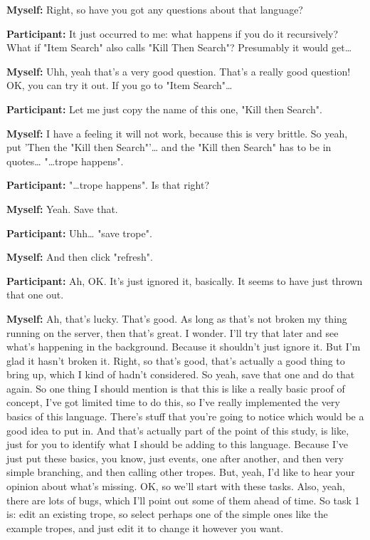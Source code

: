 \documentclass[11pt]{report}
\begin{document}
\begin{linenumbers}
\textbf{Myself:} Right, so have you got any questions about that language?

\textbf{Participant:} It just occurred to me: what happens if you do it recursively? What if "Item Search" also calls "Kill Then Search"? Presumably it would get\ldots{}

\textbf{Myself:} Uhh, yeah that's a very good question. That's a really good question! OK, you can try it out. If you go to "Item Search"\ldots{}

\textbf{Participant:} Let me just copy the name of this one, "Kill then Search".

\textbf{Myself:} I have a feeling it will not work, because this is very brittle. So yeah, put 'Then the "Kill then Search"'\ldots{} and the "Kill then Search" has to be in quotes\ldots{} "\ldots{}trope happens".

\textbf{Participant:} "\ldots{}trope happens". Is that right?

\textbf{Myself:} Yeah. Save that.

\textbf{Participant:} Uhh\ldots{} "save trope".

\textbf{Myself:} And then click "refresh".

\textbf{Participant:} Ah, OK. It's just ignored it, basically. It seems to have just thrown that one out.

\textbf{Myself:} Ah, that's lucky. That's good. As long as that's not broken my
thing running on the server, then that's great. I wonder. I'll try that later
and see what's happening in the background. Because it shouldn't just ignore it.
But I'm glad it hasn't broken it. Right, so that's good, that's actually a good
thing to bring up, which I kind of hadn't considered. So yeah, save that one and
do that again. So one thing I should mention is that this is like a really basic
proof of concept, I've got limited time to do this, so I've really implemented
the very basics of this language. There's stuff that you're going to notice
which would be a good idea to put in. And that's actually part of the point of
this study, is like, just for you to identify what I should be adding to this
language. Because I've just put these basics, you know, just events, one after
another, and then very simple branching, and then calling other tropes. But,
yeah, I'd like to hear your opinion about what's missing. OK, so we'll start
with these tasks. Also, yeah, there are lots of bugs, which I'll point out some
of them ahead of time. So task 1 is: edit an existing trope, so select perhaps
one of the simple ones like the example tropes, and just edit it to change it
however you want.


\end{linenumbers}
\end{document}
